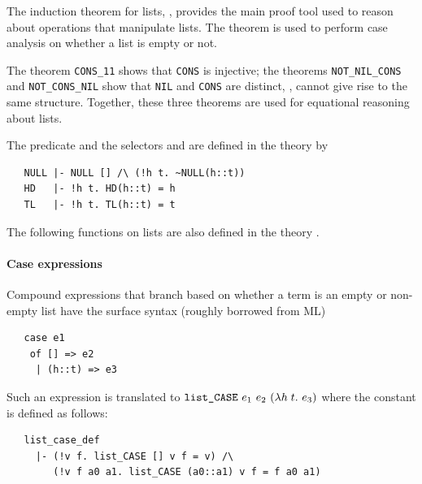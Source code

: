 The induction theorem for lists, , provides the main
proof tool used to reason about operations that manipulate lists. The
theorem  is used to perform case analysis on whether a
list is empty or not.

The theorem {\small\verb+CONS_11+} shows that {\small\verb+CONS+} is injective;
the theorems {\small\verb+NOT_NIL_CONS+} and {\small\verb+NOT_CONS_NIL+} show that
{\small\verb+NIL+} and {\small\verb+CONS+} are distinct, \ie,
cannot give rise to the same structure. Together, these three theorems
are used for equational reasoning about lists.

The predicate  and the selectors
%
%
 and  are defined in the theory  by
%
\begin{hol}
\begin{verbatim}
   NULL |- NULL [] /\ (!h t. ~NULL(h::t))
   HD   |- !h t. HD(h::t) = h
   TL   |- !h t. TL(h::t) = t
\end{verbatim}
\end{hol}

\noindent The following functions on lists are also defined in the theory .
%
%
\paragraph{Case expressions}

Compound \HOL{} expressions that branch based on whether a term is an
empty or non-empty list have the surface syntax (roughly borrowed from
ML)
\begin{hol}
\begin{verbatim}
   case e1
    of [] => e2
     | (h::t) => e3
\end{verbatim}
\end{hol}
%
Such an expression is translated to
$\holtxt{list\_CASE}\ e_1\ e_2\ (\lambda h\; t.\ e_3)$ where the constant
 is defined as follows:
\begin{hol}
\begin{verbatim}
   list_case_def
     |- (!v f. list_CASE [] v f = v) /\
        (!v f a0 a1. list_CASE (a0::a1) v f = f a0 a1)
\end{verbatim}
\end{hol}

